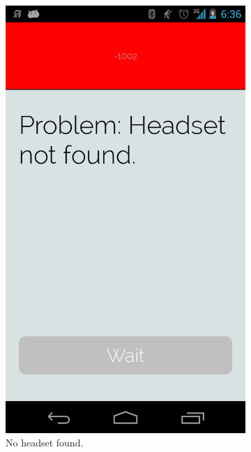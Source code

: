 \documentclass[a4paper,10pt,english,lof,lot,twoside]{puthesis}
\begin{document}
\begin{figure}
\begin{subfigure}[t]{0.30\linewidth}
\includegraphics[width=0.800\linewidth]{final-prototype-no-headset-found.png}
\caption[No headset found]{No headset found.}\label{ch-design/index:fig-final-prototype-app-flow-no-headset-found}\end{subfigure}
\begin{subfigure}[t]{0.30\linewidth}
\centering
\capstart


\end{subfigure}
\end{figure}
\end{document}
